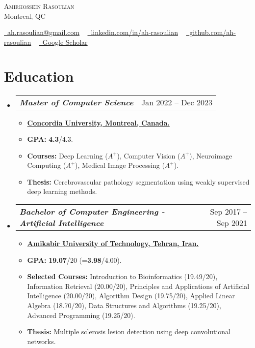 \documentclass[letterpaper,11pt]{article}
\makeatletter
\newcommand{\resumeSubItem}[1]{
  \item\small{
    {#1 \vspace{-2pt}}
  }
}
\newcommand{\resumeSubheading}[2]{
  \vspace{-2pt}\item
    \begin{tabular*}{0.983\textwidth}[t]{l@{\extracolsep{\fill}}r}
      \textbf{\textit{#1}} & \small #2 
    \end{tabular*}\vspace{-7pt}
}
\newcommand{\resumeSubHeadingListStart}{\begin{itemize}[leftmargin=9pt]}
\newcommand{\resumeSubHeadingListEnd}{\end{itemize}}
\newcommand{\resumeSubItemListStart}{\begin{itemize}[leftmargin=17pt]}
\newcommand{\resumeSubItemListEnd}{\end{itemize}\vspace{-5pt}}
\makeatother
\begin{document}
\justify

\begin{center}
    {\Huge \scshape Amirhossein Rasoulian} \\
    \vspace{1pt}
    Montreal, QC \\ 
    \vspace{1pt}
    
    \href{mailto:ah.rasoulian@gmail.com}{\raisebox{-0.2\height}\faEnvelope\  ah.rasoulian@gmail.com} ~ 
    \href{https://www.linkedin.com/in/ah-rasoulian/}{\raisebox{-0.2\height}\faLinkedin\ linkedin.com/in/ah-rasoulian}  ~
    \href{https://github.com/ah-rasoulian}{\raisebox{-0.2\height}\faGithub\ github.com/ah-rasoulian} ~
    \href{https://scholar.google.com/citations?user=_TnlwaQAAAAJ&hl=en}{\raisebox{-0.2\height}\faBook\ Google Scholar}
    \vspace{6pt}
\end{center}

\section{Education}
    \resumeSubHeadingListStart
        \resumeSubheading{Master of Computer Science}{Jan 2022 -- Dec 2023}
            \resumeSubItemListStart
                \resumeSubItem{\href{https://www.concordia.ca/}{\textbf{Concordia University, Montreal, Canada.}}}
                \resumeSubItem{\textbf{GPA:} \textbf{4.3}/4.3.}
                \resumeSubItem{\textbf{Courses:} Deep Learning ($A^+$), Computer Vision ($A^+$), Neuroimage Computing ($A^+$), Medical Image Processing ($A^+$).}
                \resumeSubItem{\textbf{Thesis:} Cerebrovascular pathology segmentation using weakly supervised deep learning methods.}
            \resumeSubItemListEnd

        \resumeSubheading {Bachelor of Computer Engineering - Artificial Intelligence}{Sep 2017 -- Sep 2021}
            \resumeSubItemListStart
                \resumeSubItem{\href{https://aut.ac.ir/en}{\textbf{Amikabir University of Technology, Tehran, Iran.}}}
                \resumeSubItem{\textbf{GPA:} \textbf{19.07}/20 (=\textbf{3.98}/4.00).}
                \resumeSubItem{\textbf{Selected Courses:} Introduction to Bioinformatics (19.49/20), Information Retrieval (20.00/20), Principles and Applications of Artificial Intelligence (20.00/20), Algorithm Design (19.75/20), Applied Linear Algebra (18.70/20), Data Structures and Algorithms (19.25/20), Advanced Programming (19.25/20).}
                \resumeSubItem{\textbf{Thesis:} Multiple sclerosis lesion detection using deep convolutional networks.}
        \resumeSubItemListEnd
    \resumeSubHeadingListEnd
\end{document}
